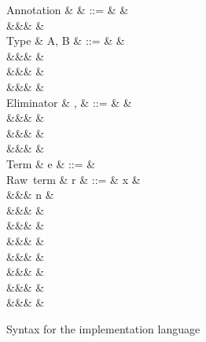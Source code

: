 \begin{figure}
\begin{syntaxfig}
\mbox{Annotation}
&
\alpha
&
::=
&
\true
&
\\
&&&
\false
&
\\[2mm]
\mbox{Type}
&
A, B
&
::=
&
\tyInt
&
\\
&&&
\tyList
&
\\
&&&
&
\\
&&&
&
\\[2mm]
\mbox{Eliminator}
&
\sigma, \tau
&
::=
&
&
\\
&&&
&
\\
&&&
&
\\
&&&
&
\\[2mm]
\mbox{Term}
&
e
&
::=
&
\\[2mm]
\mbox{Raw term}
&
r
&
::=
&
x
&
\\
&&&
n
&
\\
&&&
&
\\
&&&
&
\\
&&&
&
\\
&&&
&
\\
&&&
\exNil
&
\\
&&&
&
\\
&&&
&
\end{syntaxfig}
\caption{Syntax for the implementation language}
\label{fig:impl-language:syntax}
\end{figure}
